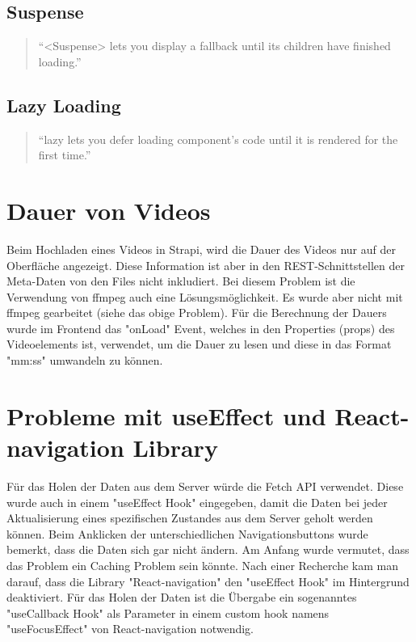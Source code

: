 \begin{spacing}{1}
    \subsection{Suspense}\label{subsec:suspense}

    \begin{quotation}

        ``<Suspense> lets you display a fallback until its children have finished
        loading.''~\cite{suspense}
    \end{quotation}

    \subsection{Lazy Loading}\label{subsec:lazy-loading}

    \begin{quotation}
        ``lazy lets you defer loading component’s code until it is rendered for
        the first time.''~\cite{lazyLoading}
    \end{quotation}


    \section{Dauer von Videos}\label{sec:dauer-von-videos}

    Beim Hochladen eines Videos in Strapi,
    wird die Dauer des Videos nur auf der Oberfläche angezeigt.
    Diese Information ist aber in den REST-Schnittstellen der Meta-Daten von den Files nicht inkludiert.
    Bei diesem Problem ist die Verwendung von ffmpeg auch eine Lösungsmöglichkeit.
    Es wurde aber nicht mit ffmpeg gearbeitet (siehe das obige Problem).
    Für die Berechnung der Dauers wurde im Frontend das "onLoad" Event,
    welches in den Properties (props) des Videoelements ist, verwendet,
    um die Dauer zu lesen und diese in das Format "mm:ss" umwandeln zu können.





    \section{Probleme mit useEffect und React-navigation Library}\label{sec:probleme-mit-useeffect-und-react-navigation-library}
    Für das Holen der Daten aus dem Server würde die Fetch API verwendet.
    Diese wurde auch in einem "useEffect Hook" eingegeben, damit die Daten bei jeder Aktualisierung eines spezifischen
    Zustandes aus dem Server geholt werden können.
    Beim Anklicken der unterschiedlichen Navigationsbuttons wurde bemerkt,
    dass die Daten sich gar nicht ändern.
    Am Anfang wurde vermutet, dass das Problem ein Caching Problem sein könnte.
    Nach einer Recherche kam man darauf, dass die Library "React-navigation" den "useEffect Hook" im Hintergrund deaktiviert.
    Für das Holen der Daten ist die Übergabe ein sogenanntes "useCallback Hook" als Parameter in einem custom hook namens "useFocusEffect"
    von React-navigation notwendig.\cite{issuesWithUseEffect}



\end{spacing}
